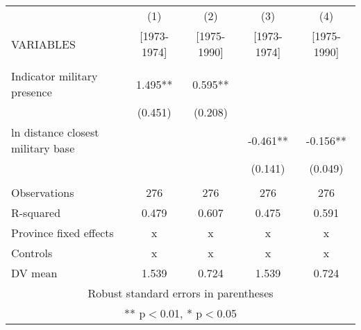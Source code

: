 \begin{tabular}{lcccc} \hline
 & (1) & (2) & (3) & (4) \\
VARIABLES & [1973-1974] & [1975-1990] & [1973-1974] & [1975-1990] \\ \hline
 &  &  &  &  \\
Indicator military presence & 1.495** & 0.595** &  &  \\
 & (0.451) & (0.208) &  &  \\
ln distance closest military base &  &  & -0.461** & -0.156** \\
 &  &  & (0.141) & (0.049) \\
 &  &  &  &  \\
Observations & 276 & 276 & 276 & 276 \\
R-squared & 0.479 & 0.607 & 0.475 & 0.591 \\
Province fixed effects & x & x & x & x \\
Controls & x & x & x & x \\
 DV mean & 1.539 & 0.724 & 1.539 & 0.724 \\ \hline
\multicolumn{5}{c}{ Robust standard errors in parentheses} \\
\multicolumn{5}{c}{ ** p$<$0.01, * p$<$0.05} \\
\end{tabular}
